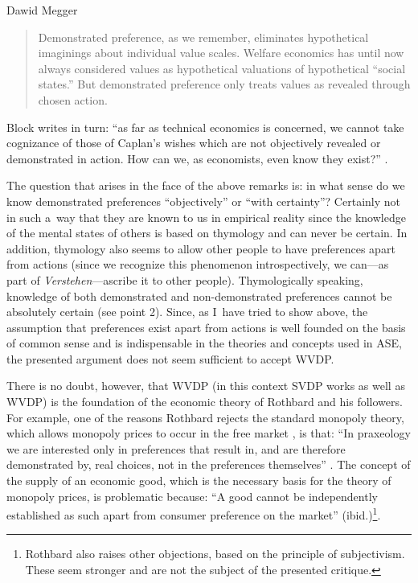\begin{artengenv}{Dawid Megger}
\begin{quote}
Demonstrated preference, as we remember, eliminates hypothetical imaginings about individual value scales. Welfare economics has until now always considered values as hypothetical valuations of hypothetical ``social states.'' But demonstrated preference only treats values as revealed through chosen action. 
\parencite[][p.320]{rothbard_present_2011}%
\end{quote}




Block writes in turn: ``as far as technical economics is concerned, we cannot take cognizance of those of Caplan's wishes which are not objectively revealed or demonstrated in action. How can we, as economists, even know they exist?'' 
\parencite[][p.23]{block_austrian_1999}.%




The question that arises in the face of the above remarks is: in what sense do we know demonstrated preferences ``objectively'' or ``with certainty''? Certainly not in such a~way that they are known to us in empirical reality since the knowledge of the mental states of others is based on thymology and can never be certain. In addition, thymology also seems to allow other people to have preferences apart from actions (since we recognize this phenomenon introspectively, we can---as part of \textit{Verstehen}---ascribe it to other people). Thymologically speaking, knowledge of both demonstrated and non-demonstrated preferences cannot be absolutely certain (see point 2). Since, as I~have tried to show above, the assumption that preferences exist apart from actions is well founded on the basis of common sense and is indispensable in the theories and concepts used in ASE, the presented argument does not seem sufficient to accept WVDP.



There is no doubt, however, that WVDP (in this context SVDP works as well as WVDP) is the foundation of the economic theory of Rothbard and his followers. For example, one of the reasons Rothbard rejects the standard monopoly theory, which allows monopoly prices to occur in the free market 
\parencite[see:][]{mises_human_1998}, %
 is that: ``In praxeology we are interested only in preferences that result in, and are therefore demonstrated by, real choices, not in the preferences themselves'' 
\parencite[][p.701]{rothbard_man_2009}. %
 The concept of the supply of an economic good, which is the necessary basis for the theory of monopoly prices, is problematic because: ``A good cannot be independently established as such apart from consumer preference on the market'' (ibid.)\footnote{Rothbard also raises other objections, based on the principle of subjectivism. These seem stronger and are not the subject of the presented critique.}.




\end{artengenv}
